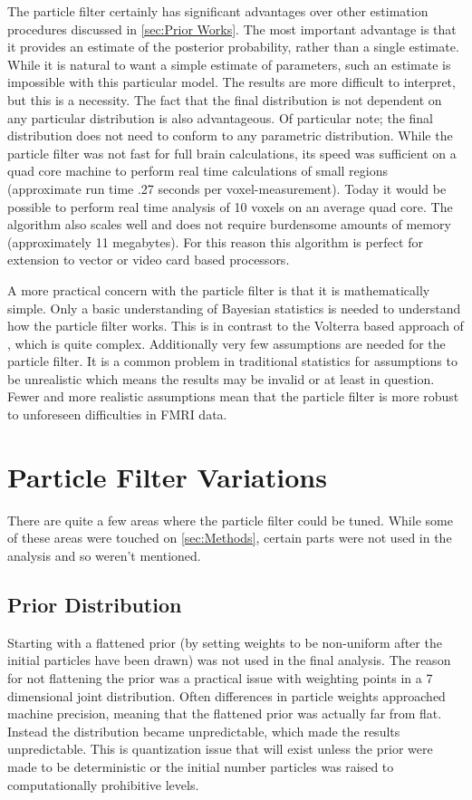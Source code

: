The particle filter certainly has significant advantages over other estimation procedures
discussed in \autoref{sec:Prior Works}. The most important advantage is that it provides
an estimate of the posterior probability, rather than a single estimate. While it is natural
to want a simple estimate of parameters, such an estimate is impossible with this particular
model. The results are more difficult to interpret, but this is a necessity. The fact that 
the final distribution is not dependent on any particular distribution is also advantageous.
Of particular note; the final distribution does not need to conform to any parametric
distribution. While the particle filter was not fast for full brain calculations, its speed
was sufficient on a quad core machine to perform real time calculations of small regions
(approximate run time .27 seconds per voxel-measurement). Today it would be possible
 to perform real time analysis of 10 voxels on an average quad core. The algorithm also scales
well and does not require burdensome amounts of memory (approximately 11 megabytes). 
For this reason this algorithm is perfect for extension to vector or video card
based processors. 

A more practical concern with the particle filter is that it is mathematically
simple. Only a basic understanding of Bayesian statistics is needed to understand
how the particle filter works. This is in contrast to the Volterra based approach
of \cite{Friston2000}, which is quite complex. Additionally very few assumptions
are needed for the particle filter. It is a common problem in traditional statistics 
for assumptions to be unrealistic which means the results may be invalid or at 
least in question. 
Fewer and more realistic assumptions mean that the particle filter is more robust
to unforeseen difficulties in FMRI data. 

\section{Particle Filter Variations}
There are quite a few areas where the particle filter could be tuned. While
some of these areas were touched on \autoref{sec:Methods}, certain parts were
not used in the analysis and so weren't mentioned. 

\subsection{Prior Distribution}
Starting with a flattened
prior (by setting weights to be non-uniform after the initial particles have
been drawn) was not used in the final analysis. The reason for not flattening
the prior was a practical issue with weighting points in a 
7 dimensional joint distribution. Often differences in particle weights approached machine 
precision, meaning that the flattened prior was actually far from flat. Instead
the distribution became unpredictable, which made the results unpredictable. This
is quantization issue that will exist unless the prior were made to be deterministic
or the initial number particles was raised to computationally prohibitive levels.

